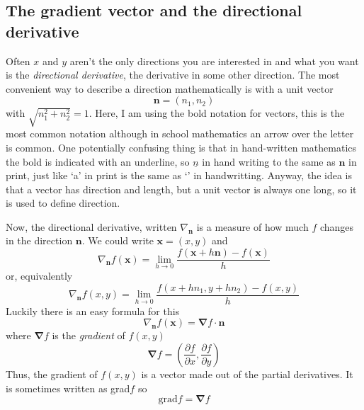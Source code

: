 \documentclass[12pt]{article}
\begin{document}
\subsection*{The gradient vector and the directional derivative}

Often $x$ and $y$ aren't the only directions you are interested in and
what you want is the \textsl{directional derivative}, the derivative in some other direction. The most convenient way to describe a direction mathematically is with a unit vector
\begin{equation}
\mathbf{n}=(n_1,n_2)
\end{equation}
with $\sqrt{n_1^2+n_2^2}=1$. Here, I am using the bold notation for
vectors, this is the most common notation although in school
mathematics an arrow over the letter is common. One potentially
confusing thing is that in hand-written mathematics the bold is
indicated with an underline, so $\underline{n}$ in hand writing to the
same as $\mathbf{n}$ in print, just like \lq{}a\rq{} in print is the
same as \lq{}\vara\rq{} in handwritting. Anyway, the idea is that a
vector has direction and length, but a unit vector is always one long,
so it is used to define direction. 

Now, the directional derivative, written $\nabla_{\textbf{n}}$ is a measure of how much $f$ changes in the direction $\mathbf{n}$. We could write $\textbf{x}=(x,y)$ and
\begin{equation}
\nabla_{\textbf{n}}f(\mathbf{x})=\lim_{h\rightarrow 0}\frac{f(\textbf{x}+h\textbf{n})-f(\textbf{x})}{h}
\end{equation}
or, equivalently
\begin{equation}
\nabla_{\textbf{n}}f(x,y)=\lim_{h\rightarrow 0}\frac{f(x+hn_1,y+hn_2)-f(x,y)}{h}
\end{equation}
Luckily there is an easy formula for this
\begin{equation}
\nabla_{\textbf{n}}f(\mathbf{x})=\mathbf{\nabla}f\cdot\mathbf{n}
\end{equation}
where $\mathbf{\nabla}f$ is the \textsl{gradient} of $f(x,y)$
\begin{equation}
\mathbf{\nabla}f=\left(\frac{\partial f}{\partial x},\frac{\partial f}{\partial y}\right)
\end{equation}
Thus, the gradient of $f(x,y)$ is a vector made out of the partial
derivatives. It is sometimes written as grad$f$ so
\begin{equation}
\mbox{grad}f=\mathbf{\nabla}f
\end{equation}
\end{document}
